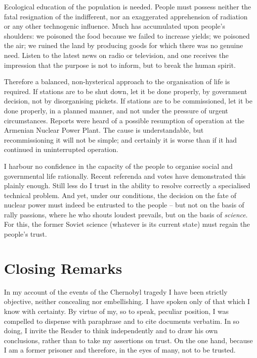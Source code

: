 \documentclass[openright]{bookest}
\begin{document}
Ecological education of the population is needed. People must possess neither the fatal resignation of the indifferent, nor an exaggerated apprehension of radiation or any other technogenic influence. Much has accumulated upon people's shoulders: we poisoned the food because we failed to increase yields; we poisoned the air; we ruined the land by producing goods for which there was no genuine need. Listen to the latest news on radio or television, and one receives the impression that the purpose is not to inform, but to break the human spirit.

Therefore a balanced, non-hysterical approach to the organisation of life is required. If stations are to be shut down, let it be done properly, by government decision, not by disorganising pickets. If stations are to be commissioned, let it be done properly, in a planned manner, and not under the pressure of urgent circumstances. Reports were heard of a possible resumption of operation at the Armenian Nuclear Power Plant. The cause is understandable, but recommissioning it will not be simple; and certainly it is worse than if it had continued in uninterrupted operation.

I harbour no confidence in the capacity of the people to organise social and governmental life rationally. Recent referenda and votes have demonstrated this plainly enough. Still less do I trust in the ability to resolve correctly a specialised technical problem. And yet, under our conditions, the decision on the fate of nuclear power must indeed be entrusted to the people -- but not on the basis of rally passions, where he who shouts loudest prevails, but on the basis of \textit{science}. For this, the former Soviet science (whatever is its current state) must regain the people's trust.

\chapter{Closing Remarks}

In my account of the events of the Chernobyl tragedy I have been strictly objective, neither concealing nor embellishing. I have spoken only of that which I know with certainty. By virtue of my, so to speak, peculiar position, I was compelled to dispense with paraphrase and to cite documents verbatim. In so doing, I invite the Reader to think independently and to draw his own conclusions, rather than to take my assertions on trust. On the one hand, because I am a former prisoner and therefore, in the eyes of many, not to be trusted.
\end{document}
